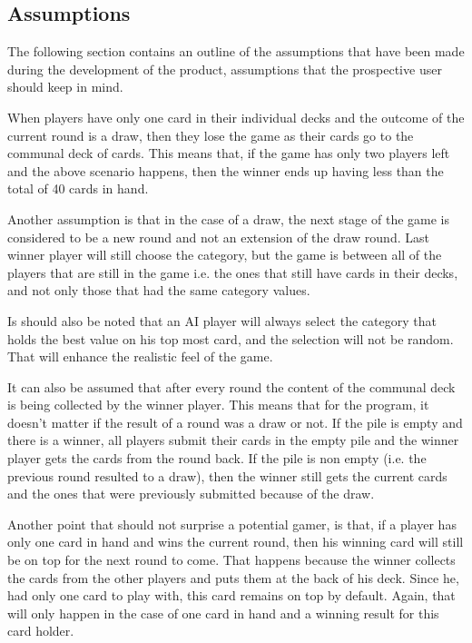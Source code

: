 \subsection{Assumptions}

The following section contains an outline of the assumptions that have been made during the development of the product, assumptions that the prospective user should keep in mind.

When players have only one card in their individual decks and the outcome of the current round is a draw, then they lose the game as their cards go to the communal deck of cards. This means that, if the game has only two players left and the above scenario happens, then the winner ends up having less than the total of 40 cards in hand.

Another assumption is that in the case of a draw, the next stage of the game is considered to be a new round and not an extension of the draw round. Last winner player will still choose the category, but the game is between all of the players that are still in the game i.e. the ones that still have cards in their decks, and not only those that had the same category values.

Is should also be noted that an AI player will always select the category that holds the best value on his top most card, and the selection will not be random. That will enhance the realistic feel of the game.

It can also be assumed that after every round the content of the communal deck is being collected by the winner player. This means that for the program, it doesn't matter if the result of a round was a draw or not. If the pile is empty and there is a winner, all players submit their cards in the empty pile and the winner player gets the cards from the round back. If the pile is non empty (i.e. the previous round resulted to a draw), then the winner still gets the current cards and the ones that were previously submitted because of the draw.

Another point that should not surprise a potential gamer, is that, if a player has only one card in hand and wins the current round, then his winning card will still be on top for the next round to come. That happens because the winner collects the cards from the other players and puts them at the back of his deck. Since he, had only one card to play with, this card remains on top by default. Again, that will only happen in the case of one card in hand and a winning result for this card holder. 

